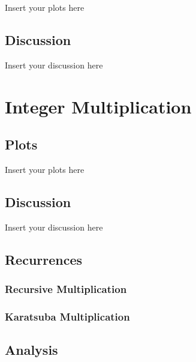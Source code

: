 \documentclass[a4paper]{article}
\begin{document}
Insert your plots here

\subsection{Discussion}

Insert your discussion here

\section{Integer Multiplication}

\subsection{Plots}

\noindent Insert your plots here

\subsection{Discussion}

\noindent Insert your discussion here

\subsection{Recurrences}

\subsubsection{Recursive Multiplication}

\subsubsection{Karatsuba Multiplication}

\subsection{Analysis}
\end{document}
